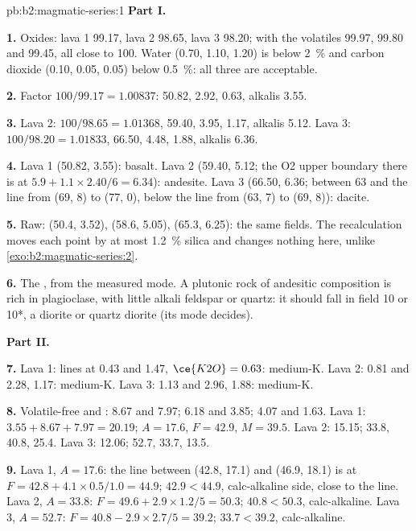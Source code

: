 \begin{solution}{pb:b2:magmatic-series:1}
\noindent\textbf{Part I.}

\textbf{1.} Oxides: lava 1 99.17, lava 2 98.65, lava 3 98.20; with the volatiles
99.97, 99.80 and 99.45, all close to 100. Water (0.70, 1.10, 1.20) is below
\qty{2}{\percent} and carbon dioxide (0.10, 0.05, 0.05) below \qty{0.5}{\percent}: all
three are acceptable.

\textbf{2.} Factor $100/99.17 = 1.00837$:  50.82,  2.92, 
0.63, alkalis 3.55.

\textbf{3.} Lava 2: $100/98.65 = 1.01368$,  59.40,  3.95, 
1.17, alkalis 5.12. Lava 3: $100/98.20 = 1.01833$,  66.50,  4.48,
 1.88, alkalis 6.36.

\textbf{4.} Lava 1 (50.82, 3.55): basalt. Lava 2 (59.40, 5.12; the O2 upper boundary
there is at $5.9 + 1.1\times2.40/6 = 6.34$): andesite. Lava 3 (66.50, 6.36; between 63
and the line from (69, 8) to (77, 0), below the line from (63, 7) to (69, 8)): dacite.

\textbf{5.} Raw: (50.4, 3.52), (58.6, 5.05), (65.3, 6.25): the same fields. The
recalculation moves each point by at most \qty{1.2}{\percent} silica and changes
nothing here, unlike \cref{exo:b2:magmatic-series:2}.

\textbf{6.} The , from the measured mode. A plutonic rock of andesitic
composition is rich in plagioclase, with little alkali feldspar or quartz: it should
fall in field 10 or 10*, a diorite or quartz diorite (its mode decides).

\noindent\textbf{Part II.}

\textbf{7.} Lava 1: lines at 0.43 and 1.47, $\ce{K2O} = 0.63$: medium-K. Lava 2: 0.81
and 2.28, 1.17: medium-K. Lava 3: 1.13 and 2.96, 1.88: medium-K.

\textbf{8.} Volatile-free  and : 8.67 and 7.97; 6.18 and 3.85; 4.07
and 1.63. Lava 1: $3.55 + 8.67 + 7.97 = 20.19$; $A = 17.6$, $F = 42.9$, $M = 39.5$.
Lava 2: 15.15; 33.8, 40.8, 25.4. Lava 3: 12.06; 52.7, 33.7, 13.5.

\textbf{9.} Lava 1, $A = 17.6$: the line between (42.8, 17.1) and (46.9, 18.1) is at
$F = 42.8 + 4.1\times0.5/1.0 = 44.9$; $42.9 < 44.9$, calc-alkaline side, close to the
line. Lava 2, $A = 33.8$: $F = 49.6 + 2.9\times1.2/5 = 50.3$; $40.8 < 50.3$,
calc-alkaline. Lava 3, $A = 52.7$: $F = 40.8 - 2.9\times2.7/5 = 39.2$; $33.7 < 39.2$,
calc-alkaline.


\end{solution}
